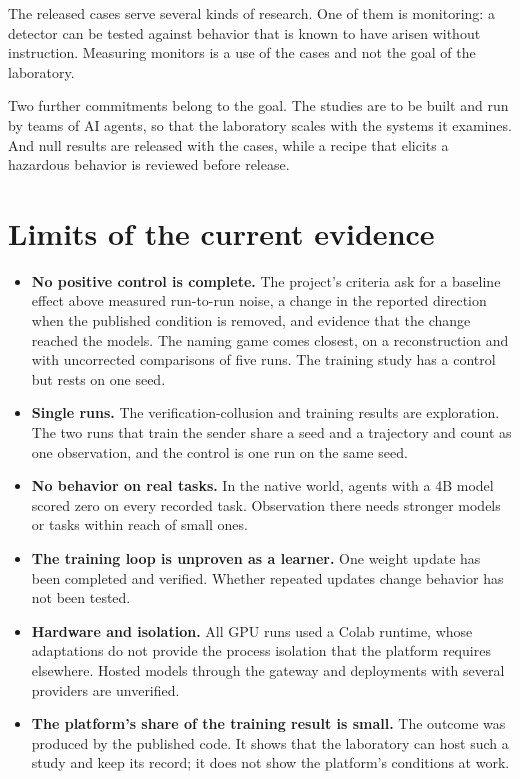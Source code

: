 \documentclass[11pt,a4paper]{article}
\begin{document}
The released cases serve several kinds of research. One of them is monitoring: a detector can be tested
against behavior that is known to have arisen without instruction. Measuring monitors is a use of the cases
and not the goal of the laboratory.

Two further commitments belong to the goal. The studies are to be built and run by teams of AI agents, so
that the laboratory scales with the systems it examines. And null results are released with the cases,
while a recipe that elicits a hazardous behavior is reviewed before release.

\FloatBarrier
\section{Limits of the current evidence}
\label{sec:limits}

\begin{itemize}
\item \textbf{No positive control is complete.} The project's criteria ask for a baseline effect above
  measured run-to-run noise, a change in the reported direction when the published condition is removed,
  and evidence that the change reached the models. The naming game comes closest, on a reconstruction and
  with uncorrected comparisons of five runs. The training study has a control but rests on one seed.
\item \textbf{Single runs.} The verification-collusion and training results are exploration. The two runs
  that train the sender share a seed and a trajectory and count as one observation, and the control is one
  run on the same seed.
\item \textbf{No behavior on real tasks.} In the native world, agents with a 4B model scored zero on every
  recorded task. Observation there needs stronger models or tasks within reach of small ones.
\item \textbf{The training loop is unproven as a learner.} One weight update has been completed and
  verified. Whether repeated updates change behavior has not been tested.
\item \textbf{Hardware and isolation.} All GPU runs used a Colab runtime, whose adaptations do not provide
  the process isolation that the platform requires elsewhere. Hosted models through the gateway and
  deployments with several providers are unverified.
\item \textbf{The platform's share of the training result is small.} The outcome was produced by the
  published code. It shows that the laboratory can host such a study and keep its record; it does not
  show the platform's conditions at work.
\end{itemize}
\end{document}
